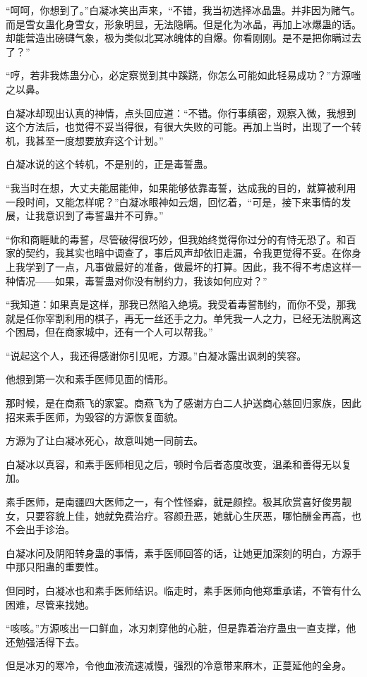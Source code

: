 \begin{this_body}
“呵呵，你想到了。”白凝冰笑出声来，“不错，我当初选择冰晶蛊。并非因为赌气。而是雪女蛊化身雪女，形象明显，无法隐瞒。但是化为冰晶，再加上冰爆蛊的话。却能营造出磅礴气象，极为类似北冥冰魄体的自爆。你看刚刚。是不是把你瞒过去了？”

“哼，若非我炼蛊分心，必定察觉到其中蹊跷，你怎么可能如此轻易成功？”方源嗤之以鼻。

白凝冰却现出认真的神情，点头回应道：“不错。你行事缜密，观察入微，我想到这个方法后，也觉得不妥当得很，有很大失败的可能。再加上当时，出现了一个转机，我甚至一度想要放弃这个计划。”

白凝冰说的这个转机，不是别的，正是毒誓蛊。

“我当时在想，大丈夫能屈能伸，如果能够依靠毒誓，达成我的目的，就算被利用一段时间，又能怎样呢？”白凝冰眼神如云烟，回忆着，“可是，接下来事情的发展，让我意识到了毒誓蛊并不可靠。”

“你和商睚眦的毒誓，尽管破得很巧妙，但我始终觉得你过分的有恃无恐了。和百家的契约，我其实也暗中调查了，事后风声却依旧走漏，令我更觉得不妥。在你身上我学到了一点，凡事做最好的准备，做最坏的打算。因此，我不得不考虑这样一种情况——如果，毒誓蛊对你没有制约力，我该如何应对？”

“我知道：如果真是这样，那我已然陷入绝境。我受着毒誓制约，而你不受，那我就是任你宰割利用的棋子，再无一丝还手之力。单凭我一人之力，已经无法脱离这个困局，但在商家城中，还有一个人可以帮我。”

“说起这个人，我还得感谢你引见呢，方源。”白凝冰露出讽刺的笑容。

他想到第一次和素手医师见面的情形。

那时候，是在商燕飞的家宴。商燕飞为了感谢方白二人护送商心慈回归家族，因此招来素手医师，为毁容的方源恢复面貌。

方源为了让白凝冰死心，故意叫她一同前去。

白凝冰以真容，和素手医师相见之后，顿时令后者态度改变，温柔和善得无以复加。

素手医师，是南疆四大医师之一，有个性怪癖，就是颜控。极其欣赏喜好俊男靓女，只要容貌上佳，她就免费治疗。容颜丑恶，她就心生厌恶，哪怕酬金再高，也不会出手诊治。

白凝冰问及阴阳转身蛊的事情，素手医师回答的话，让她更加深刻的明白，方源手中那只阳蛊的重要性。

但同时，白凝冰也和素手医师结识。临走时，素手医师向他郑重承诺，不管有什么困难，尽管来找她。

“咳咳。”方源咳出一口鲜血，冰刃刺穿他的心脏，但是靠着治疗蛊虫一直支撑，他还勉强活得下去。

但是冰刃的寒冷，令他血液流速减慢，强烈的冷意带来麻木，正蔓延他的全身。


\end{this_body}
